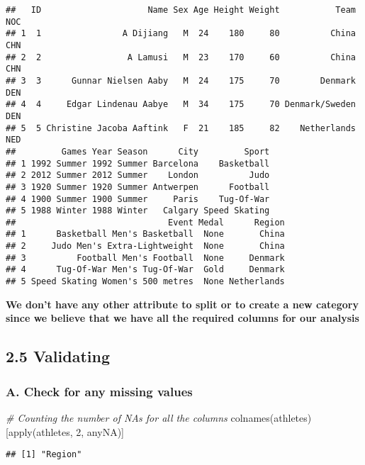 \documentclass[
]{article}
\newenvironment{Shaded}{\begin{snugshade}}{\end{snugshade}}
\newcommand{\CommentTok}[1]{\textcolor[rgb]{0.56,0.35,0.01}{\textit{#1}}}
\newcommand{\DecValTok}[1]{\textcolor[rgb]{0.00,0.00,0.81}{#1}}
\newcommand{\FunctionTok}[1]{\textcolor[rgb]{0.00,0.00,0.00}{#1}}
\newcommand{\NormalTok}[1]{#1}
\begin{document}
\begin{verbatim}
##   ID                     Name Sex Age Height Weight           Team NOC
## 1  1                A Dijiang   M  24    180     80          China CHN
## 2  2                 A Lamusi   M  23    170     60          China CHN
## 3  3      Gunnar Nielsen Aaby   M  24    175     70        Denmark DEN
## 4  4     Edgar Lindenau Aabye   M  34    175     70 Denmark/Sweden DEN
## 5  5 Christine Jacoba Aaftink   F  21    185     82    Netherlands NED
##         Games Year Season      City         Sport
## 1 1992 Summer 1992 Summer Barcelona    Basketball
## 2 2012 Summer 2012 Summer    London          Judo
## 3 1920 Summer 1920 Summer Antwerpen      Football
## 4 1900 Summer 1900 Summer     Paris    Tug-Of-War
## 5 1988 Winter 1988 Winter   Calgary Speed Skating
##                              Event Medal      Region
## 1      Basketball Men's Basketball  None       China
## 2     Judo Men's Extra-Lightweight  None       China
## 3          Football Men's Football  None     Denmark
## 4      Tug-Of-War Men's Tug-Of-War  Gold     Denmark
## 5 Speed Skating Women's 500 metres  None Netherlands
\end{verbatim}

\textbf{We don't have any other attribute to split or to create a new
category since we believe that we have all the required columns for our
analysis}

\hypertarget{validating}{%
\subsection{2.5 Validating}\label{validating}}

\hypertarget{a.-check-for-any-missing-values}{%
\subsubsection{A. Check for any missing
values}\label{a.-check-for-any-missing-values}}

\begin{Shaded}
\begin{Highlighting}[]
 \CommentTok{\# Counting the number of NA\textquotesingle{}s for all the columns}
 \FunctionTok{colnames}\NormalTok{(athletes)[}\FunctionTok{apply}\NormalTok{(athletes, }\DecValTok{2}\NormalTok{, anyNA)]}
\end{Highlighting}
\end{Shaded}

\begin{verbatim}
## [1] "Region"
\end{verbatim}
\end{document}
